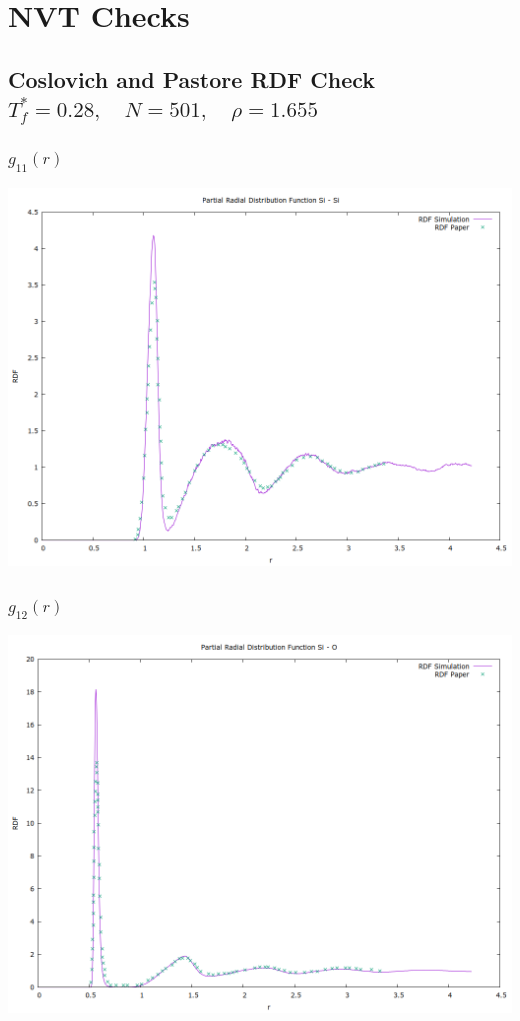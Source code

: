 \documentclass[a4paper,11pt,twoside]{article}
\begin{document}
\section{NVT Checks}
\label{sec:org49fe76d}
\subsection{Coslovich and Pastore RDF Check \(T^*_f = 0.28, \quad N = 501, \quad \rho = 1.655\)}
\label{sec:org79c8fba}
\subsubsection{\(g_{11}(r)\)}
\label{sec:orgcbb079f}
\begin{center}
\includegraphics[width=.9\linewidth]{../../runs/nvt_cool_sample_rdf/plots/rdf_11.png}
\end{center}
\subsubsection{\(g_{12}(r)\)}
\label{sec:org0c784f7}

\begin{center}
\includegraphics[width=.9\linewidth]{../../runs/nvt_cool_sample_rdf/plots/rdf_12.png}
\end{center}
\end{document}
